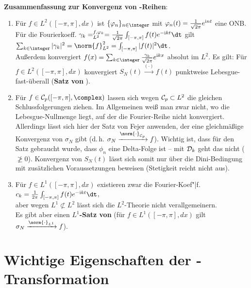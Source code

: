 \linie

\textbf{Zusammenfassung zur Konvergenz von -Reihen}:
\begin{enumerate}
    \item
    Für $f \in L^2([-\pi, \pi], dx)$ ist $\{\varphi_n\}_{n \in \integer}$
    mit $\varphi_n(t) = \frac{1}{\sqrt{2\pi}} e^{\mathrm{i} nt}$ eine ONB.
    Für die Fourierkoeff. $\gamma_k = \sp{f, \varphi_k}_{L^2} =
    \frac{1}{\sqrt{2\pi}} \int_{[-\pi, \pi]} f(t) e^{-\i kt}\dt$ gilt
    $\sum_{k \in \integer} |\gamma_k|^2 = \norm{f}_{L^2}^2 =
    \int_{[-\pi, \pi]} |f(t)|^2 \dt$.\\
    Außerdem konvergiert $f(x) = \sum_{k \in \integer}
    \frac{\gamma_k}{\sqrt{2\pi}} e^{\i kx}$ absolut im $L^2$.
    Es gilt:
    Für $f \in L^2([-\pi, \pi], dx)$ konvergiert
    $S_N(t) \xrightarrow{(\cdot)} f(t)$ punktweise Lebesgue-fast-überall
    (\textbf{Satz von }).

    \item
    Für $f \in \C_p([-\pi, \pi], \complex)$ lassen sich wegen
    $\mathcal{C}_p \subset L^2$ die gleichen Schlussfolgerungen ziehen.
    Im Allgemeinen weiß man zwar nicht, wo die Lebesgue-Nullmenge liegt,
    auf der die Fourier-Reihe nicht konvergiert.
    Allerdings lässt sich hier der Satz von Fejer anwenden, der eine
    gleichmäßige Konvergenz von $\sigma_N$ gibt
    (d.\,h. $\sigma_N \xrightarrow{\norm{\cdot}_{\C_p}} f$).
    Wichtig ist, dass für den Satz gebraucht wurde, dass $\phi_n$ eine
    Delta-Folge ist -- mit $\mathcal{D}_k$ geht das nicht ($\not\ge 0$).
    Konvergenz von $S_N(t)$ lässt sich somit nur über die Dini-Bedingung mit
    zusätzlichen Voraussetzungen beweisen (Stetigkeit reicht nicht aus).

    \item
    Für $f \in L^1([-\pi, \pi], dx)$ existieren zwar die
    Fourier-Koef"|f.
    $c_k = \frac{1}{2\pi} \int_{[-\pi, \pi]} f(t) e^{-\i kt} \dt$,\\
    aber wegen $L^1 \not\subset L^2$ lässt sich die $L^2$-Theorie nicht
    verallgemeinern.\\
    Es gibt aber einen \textbf{$L^1$-Satz von }
    (für $f \in L^1([-\pi, \pi], dx)$ gilt
    $\sigma_N \xrightarrow{\norm{\cdot}_{L^1}} f$).
\end{enumerate}

\section{%
    Wichtige Eigenschaften der -Transformation%
}

